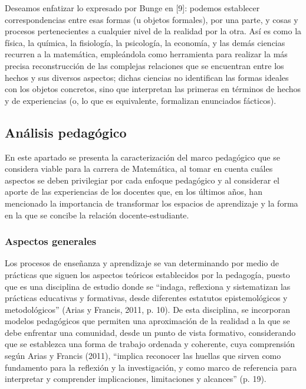 \begin{itemize}
    Deseamos enfatizar lo expresado por Bunge en [9]: podemos establecer correspondencias entre esas formas (u objetos formales), por una parte, y cosas y procesos pertenecientes a cualquier nivel de la realidad por la otra. Así es como la física, la química, la fisiología, la psicología, la economía, y las demás ciencias recurren a la matemática, empleándola como herramienta para realizar la más precisa reconstrucción de las complejas relaciones que se encuentran entre los hechos y sus diversos aspectos; dichas ciencias no identifican las formas ideales con los objetos concretos, sino que interpretan las primeras en términos de hechos y de experiencias (o, lo que es equivalente, formalizan enunciados fácticos).
     
     \end{itemize}

\subsection{Análisis pedagógico}

En este apartado se presenta la caracterización del marco pedagógico que se considera viable para la carrera de Matemática, al tomar en cuenta cuáles aspectos se deben privilegiar por cada enfoque pedagógico y al considerar el aporte de las experiencias de los docentes que, en los últimos años, han mencionado la importancia de transformar los espacios de aprendizaje y la forma en la que se concibe la relación docente-estudiante. 

\subsubsection{Aspectos generales}

Los procesos de enseñanza y aprendizaje se van determinando por medio de prácticas que siguen los aspectos teóricos establecidos por la pedagogía, puesto que es una disciplina de estudio donde se “indaga, reflexiona y sistematizan las prácticas educativas y formativas, desde diferentes estatutos epistemológicos y metodológicos” (Arias y Francis, 2011, p. 10). De esta disciplina, se incorporan modelos pedagógicos que permiten una aproximación de la realidad a la que se debe enfrentar una comunidad, desde un punto de vista formativo, considerando que se establezca una forma de trabajo ordenada y coherente, cuya comprensión según Arias y Francis (2011), “implica reconocer las huellas que sirven como fundamento para la reflexión y la investigación, y como marco de referencia para interpretar y comprender implicaciones, limitaciones y alcances” (p. 19).

